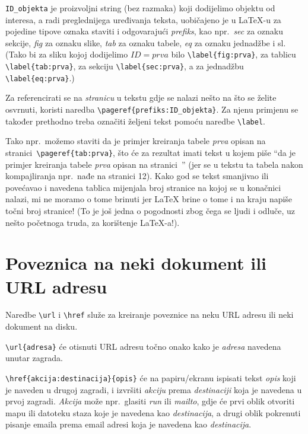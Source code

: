 \verb|ID_objekta| je proizvoljni string (bez razmaka) koji dodijelimo objektu od interesa, a radi preglednijega uređivanja teksta, uobičajeno je u \LaTeX-u za pojedine tipove oznaka staviti i odgovarajući \emph{prefiks}, kao npr.\ \emph{sec} za oznaku sekcije, \emph{fig} za oznaku slike, \emph{tab} za oznaku tabele, \emph{eq} za oznaku jednadžbe i sl. (Tako bi za sliku kojoj dodijelimo $ID=prva$ bilo \verb|\label{fig:prva}|, za tablicu \verb|\label{tab:prva}|, za sekciju \verb|\label{sec:prva}|, a za jednadžbu \verb|\label{eq:prva}|.)

Za referencirati se na \emph{stranicu} u tekstu gdje se nalazi nešto na što se želite osvrnuti, koristi naredba {\color{red} \verb|\pageref{prefiks:ID_objekta}|}. Za njenu primjenu se također prethodno treba označiti željeni tekst pomoću naredbe \verb|\label|.

Tako npr.\ možemo staviti da je primjer kreiranja tabele \emph{prva} opisan na stranici~\verb|\pageref{tab:prva}|, što će za rezultat imati tekst u kojem piše ``da je primjer kreiranja tabele \emph{prva} opisan na stranici~\pageref{tab:prva}'' (jer se u tekstu ta tabela nakon kompajliranja npr.\ nađe na stranici 12). Kako god se tekst smanjivao ili povećavao i navedena tablica mijenjala broj stranice na kojoj se u konačnici nalazi, mi ne moramo o tome brinuti jer \LaTeX{} brine o tome i na kraju napiše točni broj stranice! (To je još jedna o pogodnosti zbog čega se ljudi i odluče, uz nešto početnoga truda, za korištenje \LaTeX-a!).



\section{Poveznica na neki dokument ili URL adresu}
Naredbe \verb|\url| i \verb|\href| služe za kreiranje poveznice na neku URL adresu ili neki dokument na disku.

{\color{red}\verb|\url{adresa}|} će otisnuti URL adresu točno onako kako je \emph{adresa} navedena unutar zagrada.

{\color{red}\verb|\href{akcija:destinacija}{opis}|} će na papiru/ekranu ispisati tekst \emph{opis} koji je naveden u drugoj zagradi, i izvršiti \emph{akciju} prema \emph{destinaciji} koja je navedena u prvoj zagradi. 
\emph{Akcija} može npr.\ glasiti \emph{run} ili \emph{mailto}, gdje će prvi oblik otvoriti mapu ili datoteku staza koje je navedena kao \emph{destinacija}, a drugi oblik pokrenuti pisanje emaila prema email adresi koja je navedena kao \emph{destinacija}.

